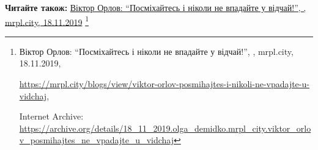  
 
 
 
 

\def\pubIA{https://archive.org/details/18_11_2019.olga_demidko.mrpl_city.viktor_orlov_posmihajtes_ne_vpadajte_u_vidchaj}
\def\pubTitle{Віктор Орлов: \enquote{Посміхайтесь і ніколи не впадайте у відчай!}}
\def\pubDate{18.11.2019}
\def\pubOrigin{https://mrpl.city/blogs/view/viktor-orlov-posmihajtes-i-nikoli-ne-vpadajte-u-vidchaj}
\def\pubAuthor{\pubAuthorDemidko}

\textbf{Читайте також:} \href{\pubIA}{%
\pubTitle, \pubAuthor, mrpl.city, \pubDate}%
\footnote{\pubTitle, \pubAuthor, mrpl.city, \pubDate, \par\url{\pubOrigin}, \par Internet Archive: \url{\pubIA}}
